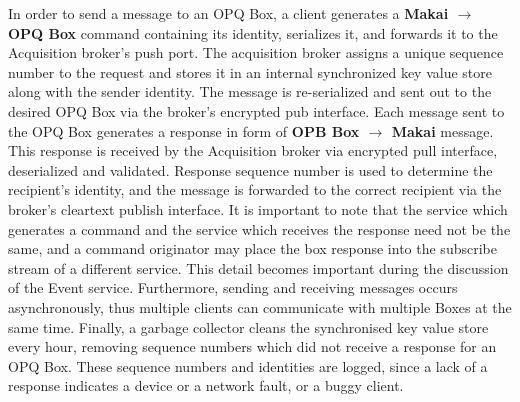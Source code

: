 In order to send a message to an OPQ Box, a client generates a \textbf{Makai $\rightarrow$ OPQ Box} command containing its identity, serializes it, and forwards it to the Acquisition broker's push port.
The acquisition broker assigns a unique sequence number to the request and stores it in an internal synchronized key value store along with the sender identity.
The message is re-serialized and sent out to the desired OPQ Box via the broker's encrypted pub interface.
Each message sent to the OPQ Box generates a response in form of \textbf{OPB Box $\rightarrow$ Makai} message.
This response is received by the Acquisition broker via encrypted pull interface, deserialized and validated.
Response sequence number is used to determine the recipient's identity, and the message is forwarded to the correct recipient via the broker's cleartext publish interface.
It is important to note that the service which generates a command and the service which receives the response need not be the same, and a command originator may place the box response into the subscribe stream of a different service.
This detail becomes important during the discussion of the Event service.
Furthermore, sending and receiving messages occurs asynchronously, thus multiple clients can communicate with multiple Boxes at the same time.
Finally, a garbage collector cleans the synchronised key value store every hour, removing sequence numbers which did not receive a response for an OPQ Box.
These sequence numbers and identities are logged, since a lack of a response indicates a device or a network fault, or a buggy client.


